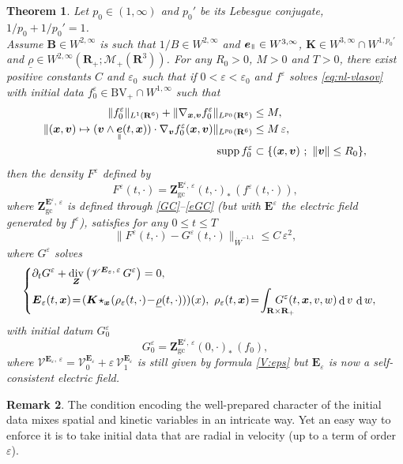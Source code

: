 \documentclass[JEP,XML,SOM,Unicode]{cedram}
\let\mathcal\mathscr
\newenvironment{splitcases}
{\begin{cases}\begin{aligned}}
{\end{aligned}\end{cases}}
\newcommand{\sep}{\ ;\ }
\newcommand{\BV}{\mathrm{BV}}
\let\eps\varepsilon
\let\d\partial
\DeclareMathOperator\dD{d}\let\dd\dD
\DeclareMathOperator{\Div}{div}
\theoremstyle{plain}
\newtheorem{theorem}{Theorem}[section]
\theoremstyle{definition}
\newtheorem{remark}[theorem]{Remark}
\newcommand\br{\begin{remark}}
\newcommand\er{\end{remark}}
\newcommand{\be}{\begin{equation}}
\newcommand{\ee}{\end{equation}}
\newcommand{\bt}{\begin{theorem}}
\newcommand{\et}{\end{theorem}}
\newcommand\R{\mathbf R}
\newcommand\bB{{\boldsymbol B}}
\newcommand\bE{{\boldsymbol E}}
\newcommand\bK{{\boldsymbol K}}
\newcommand\bZ{{\boldsymbol Z}}
\newcommand\bfv{{\boldsymbol v}}
\newcommand\bfx{{\boldsymbol x}}
\newcommand\bfZ{{\boldsymbol Z}}
\newcommand\urho{{\underline \rho}}
\newcommand\cM{{\mathcal M}}
\newcommand\cV{{\mathcal V}}
\DeclareMathOperator{\beD}{\boldsymbol{e}}
\newcommand\eDpar{\beD_\mypar}
\newcommand{\ZGC}{\bfZ_\mathrm{gc}}
\newcommand{\mypar}{{\mkern3mu\vphantom{\perp}\vrule depth 0pt\mkern2mu\vrule depth 0pt\mkern3mu}}
\begin{document}
\bt
\label{th:2-nl}
Let $p_0\in(1,\infty)$ and $p_0'$ be its Lebesgue conjugate, $1/p_0+1/p_0'=1$.\\
Assume $\bB\in W^{2,\infty}$ is such that $1/B\in W^{2,\infty}$ and $\eDpar\in W^{3,\infty}$, $\bK\in W^{3,\infty}\cap W^{1,p_0'}$ and $\urho\in W^{2,\infty}(\R_+;\cM_+(\R^3))$. For any $R_0>0$, $M>0$ and $T>0$, there exist positive constants $C$ and $\eps_0$ such that if $0<\eps<\eps_0$ and $f^\eps$ solves \eqref{eq:nl-vlasov} with initial data $f_0^\eps\in \BV_+\cap W^{1,\infty}$ such that\enlargethispage{\baselineskip}%
\begin{align*}
\|f_0^\eps\|_{L^1(\R^6)}+\|\nabla_{\bfx,\bfv}f_0^\eps\|_{L^{p_0}(\R^6)}&\leq M,\\
\|(\bfx,\bfv)\mapsto (\bfv\wedge\eDpar(t,\bfx))\cdot\nabla_{\bfv}f_0^\eps(\bfx,\bfv)\|_{L^{p_0}(\R^6)}&\leq M\,\eps,\\
\operatorname{supp}f_0^\eps&\subset
\{(\bfx,\bfv)\sep \|\bfv\|\leq R_0\},
\end{align*}
then the density $F^\eps$ defined by
\[
F^\eps(t,\cdot)= \ZGC^{\bE^\eps,\,\eps}(t,\cdot)_* \,(f^\eps(t,\cdot)),
\]
where $\ZGC^{\bE^\eps,\,\eps}$ is defined through \eqref{GC}--\eqref{eGC} (but with $\bE^\eps$ the electric field generated by $f^\eps$), satisfies for any $0\leq t\leq T$
\[
\|F^\eps(t,\cdot)-G^\eps(t,\cdot)\|_{\dot{W}^{-1,1}}\leq C\,\eps^2,
\]
where $G^\eps$ solves
\be
\label{eq:2nd-nl}
\begin{splitcases}
&\d_t G^\eps+\Div_\bfZ \left(\cV^{\bE_\eps,\,\eps}\,G^\eps \right) =0,\\
&\bE_\eps(t,\bfx)\!=\!(\bK\!\star_{\bfx}\!(\rho_\eps(t,\cdot)\!-\!\urho(t,\cdot)))(x),\ 
\rho_\eps(t,\bfx)\!=\!\int_{\R\times\R_+}\hspace*{-7mm}G^\eps(t,\bfx,v,w)\dD v\,\dD w,
\end{splitcases}
\ee
with initial datum $G_{0}^\eps$
\be
\label{eq:2nd-nlG0}
G_{0}^\eps= \bZ_\mathrm{gc}^{\bE^\eps,\,\eps}(0,\cdot)_* \,(f_0),
\ee
where $\cV^{\bE_\eps,\,\eps}=\cV^{\bE_\eps}_0+\eps\,\cV^{\bE_\eps}_1$ is still given by formula \eqref{V:eps} but $\bE_\eps$ is now a self-consistent electric field.
\et

\br
The condition encoding the well-prepared character of the initial data mixes spatial and kinetic variables in an intricate way. Yet an easy way to enforce it is to take initial data that are radial in velocity (up to a term of order $\eps$).
\er
\end{document}
